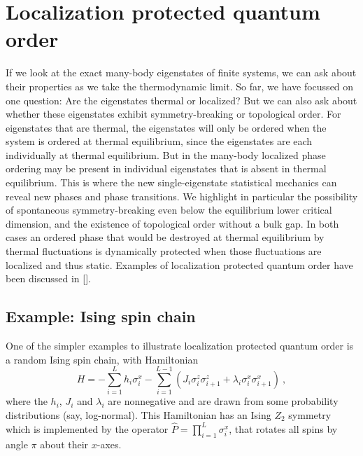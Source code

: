 \documentclass[amsmath,onecolumn, superscriptaddress,preprint,aps]{revtex4}
\renewcommand{\cite}[1]{[\onlinecite{#1}]}
\begin{document}
  \section{Localization protected quantum order}
  \label{lpqo}
  If we look at the exact many-body eigenstates of finite systems, we can ask about their properties as we take the thermodynamic limit.  So far, we have focussed on one question: Are the eigenstates thermal or localized?  But we can also ask about whether these eigenstates exhibit symmetry-breaking or topological order.  For eigenstates that are thermal, the eigenstates will only be ordered when the system is ordered at thermal equilibrium, since the eigenstates are each individually at thermal equilibrium.  But in the many-body localized phase ordering may be present in individual eigenstates that is absent in thermal equilibrium.  This is where the new single-eigenstate statistical mechanics can reveal new phases and phase transitions.
We highlight in particular the possibility of spontaneous symmetry-breaking even below the equilibrium lower critical dimension, and the existence of topological order without a bulk gap.  In both cases an ordered phase that would be destroyed at thermal equilibrium by thermal fluctuations is dynamically protected when those fluctuations are localized and thus static.  Examples of localization protected quantum order have been discussed in \cite{LPQO, Bauer, Pekker, Vosk, Bahri, Chandran}.

\subsection{Example: Ising spin chain}
One of the simpler examples to illustrate localization protected quantum order is a random Ising spin chain, with Hamiltonian
  \begin{equation}
  H = - \sum_{i=1}^L h_i \sigma^x_i - \sum_{i=1}^{L-1}(J_i \sigma^z_i \sigma^z_{i+1} + \lambda_i \sigma^x_i \sigma^x_{i+1}) ~, \label{eq: TFIM}
  \end{equation}
  where the $h_i$, $J_i$ and $\lambda_i$ are nonnegative and are drawn from some probability distributions (say, log-normal).
  This Hamiltonian has an Ising $Z_2$ symmetry which is implemented by the operator $\hat P = \prod_{i=1}^L \sigma^x_i$, that rotates all spins by angle $\pi$ about their $x$-axes.
\end{document}
